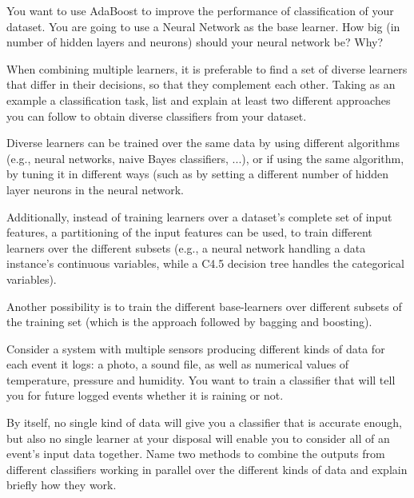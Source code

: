 \documentclass[11pt]{article}
\begin{document}

You want to use AdaBoost to improve the performance of classification
of your dataset. You are going to use a Neural Network as the base
learner.  How big (in number of hidden layers and neurons) should
your neural network be? Why?


When combining multiple learners, it is preferable to find a set of diverse learners that differ in their decisions, so that they complement each other. Taking as an example a classification task, list and explain at least two different approaches you can follow to obtain diverse classifiers from your dataset.

\ans
Diverse learners can be trained over the same data by using different algorithms (e.g., neural networks, naive Bayes classifiers, ...), or if using the same algorithm, by tuning it in different ways (such as by setting a different number of hidden layer neurons in the neural network.  

Additionally, instead of training learners over a dataset's complete set of input features, a partitioning of the input features can be used, to train different learners over the different subsets (e.g., a neural network handling a data instance’s continuous variables, while a C4.5 decision tree handles the categorical variables). 

Another possibility is to train the different base-learners over different subsets of the training set (which is the approach followed by bagging and boosting). 

Consider a system with multiple sensors producing different kinds of data for each event it logs: a photo, a sound file, as well as numerical values of temperature, pressure and humidity. You want to train a classifier that will tell you for future logged events whether it is raining or not. 

By itself, no single kind of data will give you a classifier that is accurate enough, but also no single learner at your disposal will enable you to consider all of an event's input data together. Name
two methods to combine the outputs from different classifiers working in parallel over the different kinds of data and explain briefly how they work.
\end{document}
